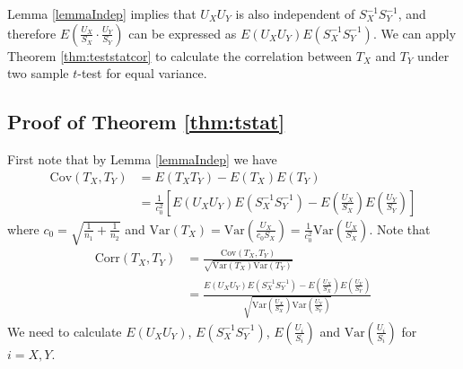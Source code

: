\documentclass[12pt, a4paper]{article}
\newcommand{\cov}{\text{Cov}}
\newcommand{\cor}{\text{Corr}}
\newcommand{\var}{\text{Var}}
\begin{document}
	
	Lemma \ref{lemmaIndep} implies that  $U_XU_Y$ is also independent of $S_X^{-1}S_Y^{-1}$, and
	therefore $E(\frac{U_X}{S_X} \cdot\frac{U_Y}{S_Y})$ can be expressed as
	$E(U_XU_Y)E(S_X^{-1}S_Y^{-1})$. We can apply Theorem \ref{thm:teststatcor} to calculate the 
	correlation between $T_X$ and $T_Y$ under two sample $t$-test for equal variance. 
	
	\subsection{Proof of Theorem \ref{thm:tstat}} 
	First note that by Lemma  \ref{lemmaIndep} we have
	\begin{align*}
	\cov(T_X, T_Y) &= E(T_XT_Y) - E(T_X)E(T_Y) \\
	& = \frac{1}{c_0^2} \left[E(U_XU_Y)E(S_X^{-1}S_Y^{-1}) - E(\frac{U_X}{S_X})E( 
	\frac{U_Y}{S_Y})\right]   
	\end{align*}
	where $c_0 = \sqrt{\frac{1}{n_1} + \frac{1}{n_2}}$ and $\var(T_X) = \var(\frac{U_X}{c_0S_X})=
	\frac{1}{c_0^2}\var(\frac{U_X}{S_X})$. 
	Note that 
	\begin{equation}\label{eq:Tcorrelation}
	\begin{aligned}
	\cor(T_X, T_Y) & = \frac{\cov(T_X, T_Y) }{\sqrt{\var(T_X) \var(T_Y) }} \\
	& = \frac{E(U_XU_Y)E(S_X^{-1}S_Y^{-1}) - E(\frac{U_X}{S_X})E(
		\frac{U_Y}{S_Y})}{\sqrt{\var(\frac{U_X}{S_X})\var(\frac{U_Y}{S_Y})}} 
	\end{aligned}
	\end{equation}
	We need to calculate $E(U_XU_Y)$, $E(S_X^{-1}S_Y^{-1})$, $ E(\frac{U_i}{S_i})$ and
	$\var(\frac{U_i}{S_i})$ for $i =X, Y$. 
\end{document}
